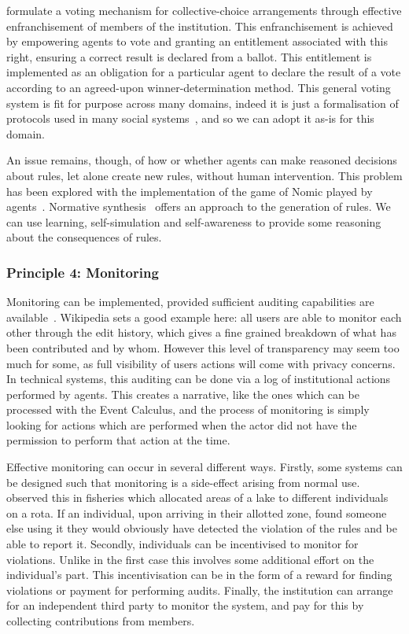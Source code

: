  formulate a voting mechanism for collective-choice arrangements through effective enfranchisement of members of the institution. This enfranchisement is achieved by empowering agents to vote and granting an entitlement associated with this right, ensuring a correct result is declared from a ballot. 
This entitlement is implemented as an obligation for a particular agent to declare the result of a vote according to an agreed-upon winner-determination method. 
This general voting system is fit for purpose across many domains, indeed it is just a formalisation of protocols used in many social systems~\citep{Pitt2005a}, and so we can adopt it as-is for this domain.

An issue remains, though, of how or whether agents can make reasoned decisions about rules, let alone create new rules, without human intervention. This problem has been explored with the implementation of the game of Nomic played by agents~\citep{Holland2013}. 
Normative synthesis~\citep{Morales2013} offers an approach to the generation of rules. 
We can use learning, self-simulation and self-awareness to provide some reasoning about the consequences of rules.

\subsubsection*{Principle 4: Monitoring}

Monitoring can be implemented, provided sufficient auditing capabilities are available~\citep{Pitt2012b}. Wikipedia sets a good example here: all users are able to monitor each other through the edit history, which gives a fine grained breakdown of what has been contributed and by whom. However this level of transparency may seem too much for some, as full visibility of users actions will come with privacy concerns. 
In technical systems, this auditing can be done via a log of institutional actions performed by agents. This creates a narrative, like the ones which can be processed with the Event Calculus, and the process of monitoring is simply looking for actions which are performed when the actor did not have the permission to perform that action at the time.

Effective monitoring can occur in several different ways. 
Firstly, some systems can be designed such that monitoring is a side-effect arising from normal use. 
 observed this in fisheries which allocated areas of a lake to different individuals on a rota. 
If an individual, upon arriving in their allotted zone, found someone else using it they would obviously have detected the violation of the rules and be able to report it. 
Secondly, individuals can be incentivised to monitor for violations. Unlike in the first case this involves some additional effort on the individual's part. 
This incentivisation can be in the form of a reward for finding violations or payment for performing audits. 
Finally, the institution can arrange for an independent third party to monitor the system, and pay for this by collecting contributions from members.

